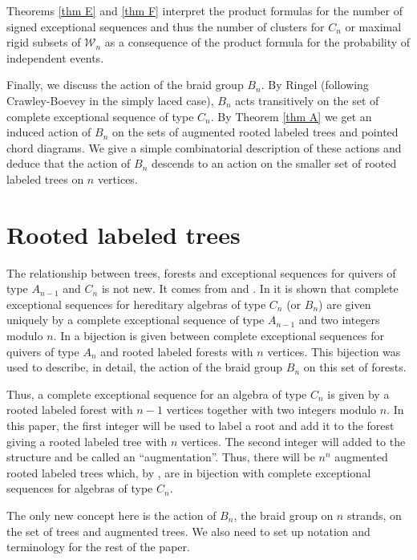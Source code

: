 \documentclass[11pt]{amsart}
\theoremstyle{definition}
\theoremstyle{remark}
\numberwithin{equation}{section}
\newcommand{\cW}{\ensuremath{{\mathcal{W}}}}
\begin{document}
Theorems \ref{thm E} and \ref{thm F} interpret the product formulas for the number of signed exceptional sequences and thus the number of clusters for $C_n$ or maximal rigid subsets of $\cW_n$ as a consequence of the product formula for the probability of independent events.


Finally, we discuss the action of the braid group $B_n$. By Ringel \cite{RingelExcSeq} (following {Crawley-Boevey} \cite{Crawley-Boevey} in the simply laced case), $B_n$ acts transitively on the set of complete exceptional sequence of type $C_n$. By Theorem \ref{thm A} we get an induced action of $B_n$ on the sets of augmented rooted labeled trees and pointed chord diagrams. We give a simple combinatorial description of these actions and deduce that the action of $B_n$ descends to an action on the smaller set of rooted labeled trees on $n$ vertices. 



\section{Rooted labeled trees}\label{sec: rooted trees}

The relationship between trees, forests and exceptional sequences for quivers of type $A_{n-1}$ and $C_n$ is not new. It comes from \cite{Ringel2} and \cite{Ig-Sen}. In \cite{Ringel2} it is shown that complete exceptional sequences for hereditary algebras of type $C_n$ (or $B_n$) are given uniquely by a complete exceptional sequence of type $A_{n-1}$ and two integers modulo $n$. In \cite{Ig-Sen} a bijection is given between complete exceptional sequences for quivers of type $A_{n}$ and rooted labeled forests with $n$ vertices. This bijection was used to describe, in detail, the action of the braid group $B_n$ on this set of forests.

Thus, a complete exceptional sequence for an algebra of type $C_n$ is given by a rooted labeled forest with $n-1$ vertices together with two integers modulo $n$. In this paper, the first integer will be used to label a root and add it to the forest giving a rooted labeled tree with $n$ vertices. The second integer will added to the structure and be called an ``augmentation''. Thus, there will be $n^n$ augmented rooted labeled trees which, by \cite{Ringel2}, are in bijection with complete exceptional sequences for algebras of type $C_n$.

 The only new concept here is the action of $B_n$, the braid group on $n$ strands, on the set of trees and augmented trees. We also need to set up notation and terminology for the rest of the paper.
\end{document}
